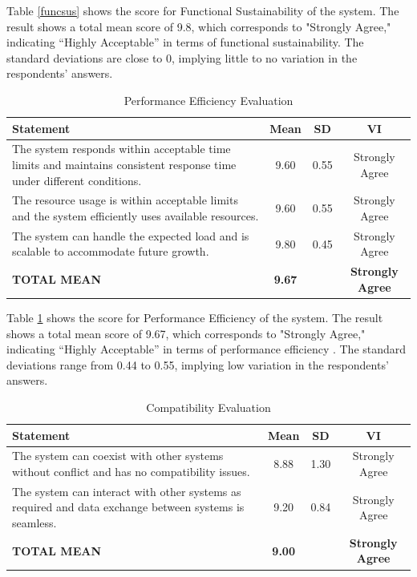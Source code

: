 	
	Table \ref{funcsus} shows the score for Functional Sustainability of the system. The result shows a total mean score of 9.8, which corresponds to "Strongly Agree," indicating “Highly Acceptable” in terms of functional sustainability. The standard deviations are close to 0, implying little to no variation in the respondents’ answers.
	
	\begin{table}[h!]
		\centering
		\caption{Performance Efficiency Evaluation}
		\label{perfeff}
		\renewcommand{\arraystretch}{1.2}
		\begin{tabularx}{\linewidth}{|X|c|c|c|}
			\hline
			\textbf{Statement} & \textbf{Mean} & \textbf{SD} & \textbf{VI} \\ \hline
			The system responds within acceptable time limits and maintains consistent response time under different conditions.
			& 9.60 & 0.55 & Strongly Agree \\ \hline
			The resource usage is within acceptable limits and the system efficiently uses available resources.
			& 9.60 & 0.55 & Strongly Agree \\ \hline
			The system can handle the expected load and is scalable to accommodate future growth.
			& 9.80 & 0.45 & Strongly Agree \\ \hline
			\textbf{TOTAL MEAN} & \textbf{9.67} & & \textbf{Strongly Agree} \\ \hline
		\end{tabularx}
	\end{table}
	
	Table \ref{perfeff} shows the score for Performance Efficiency of the system. The result shows a total mean score of 9.67, which corresponds to "Strongly Agree," indicating “Highly Acceptable” in terms of performance efficiency . The standard deviations range from 0.44 to 0.55, implying low variation in the respondents’ answers.
	
	\begin{table}[h!]
		\centering
		\caption{Compatibility Evaluation}
		\label{comptbl}
		\renewcommand{\arraystretch}{1.2}
		\begin{tabularx}{\linewidth}{|X|c|c|c|}
			\hline
			\textbf{Statement} & \textbf{Mean} & \textbf{SD} & \textbf{VI} \\ \hline
			The system can coexist with other systems without conflict and has no compatibility issues.
			& 8.88 & 1.30 & Strongly Agree \\ \hline
			The system can interact with other systems as required and data exchange between systems is seamless.
			& 9.20 & 0.84 & Strongly Agree \\ \hline
			\textbf{TOTAL MEAN} & \textbf{9.00} & & \textbf{Strongly Agree} \\ \hline
		\end{tabularx}
	\end{table}
	
